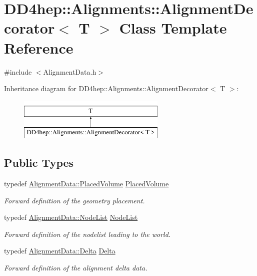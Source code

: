 \hypertarget{class_d_d4hep_1_1_alignments_1_1_alignment_decorator}{}\section{D\+D4hep\+:\+:Alignments\+:\+:Alignment\+Decorator$<$ T $>$ Class Template Reference}
\label{class_d_d4hep_1_1_alignments_1_1_alignment_decorator}


{\ttfamily \#include $<$Alignment\+Data.\+h$>$}

Inheritance diagram for D\+D4hep\+:\+:Alignments\+:\+:Alignment\+Decorator$<$ T $>$\+:\begin{figure}[H]
\begin{center}
\leavevmode
\includegraphics[height=2.000000cm]{class_d_d4hep_1_1_alignments_1_1_alignment_decorator}
\end{center}
\end{figure}
\subsection*{Public Types}
\begin{DoxyCompactItemize}
\item 
typedef \hyperlink{class_d_d4hep_1_1_alignments_1_1_alignment_data_aab2d43f5a4a4c2163e0a04905306525a}{Alignment\+Data\+::\+Placed\+Volume} \hyperlink{class_d_d4hep_1_1_alignments_1_1_alignment_decorator_a3dc9016a6686627ec2e6584aed9c8eeb}{Placed\+Volume}
\begin{DoxyCompactList}\small\item\em Forward definition of the geometry placement. \end{DoxyCompactList}\item 
typedef \hyperlink{class_d_d4hep_1_1_alignments_1_1_alignment_data_a3a667fd798d7523d75accee832d64521}{Alignment\+Data\+::\+Node\+List} \hyperlink{class_d_d4hep_1_1_alignments_1_1_alignment_decorator_aedab1bae256b0583734ed4325c58a7a7}{Node\+List}
\begin{DoxyCompactList}\small\item\em Forward definition of the nodelist leading to the world. \end{DoxyCompactList}\item 
typedef \hyperlink{class_d_d4hep_1_1_alignments_1_1_alignment_data_a3e67a5cbb3449006e9552b0f7bd98d45}{Alignment\+Data\+::\+Delta} \hyperlink{class_d_d4hep_1_1_alignments_1_1_alignment_decorator_aafa729192cc27e7d36f6e9cfd3484289}{Delta}
\begin{DoxyCompactList}\small\item\em Forward definition of the alignment delta data. \end{DoxyCompactList}\end{DoxyCompactItemize}
